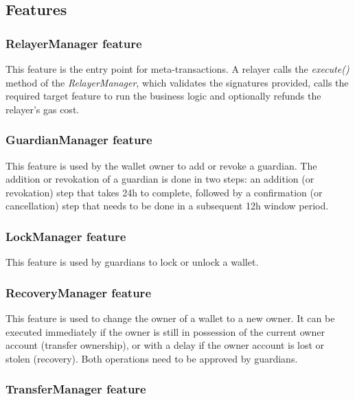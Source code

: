 \documentclass[12pt]{article}
\begin{document}
\subsection{Features}

\subsubsection{RelayerManager feature}\label{RelayerManager}

This feature is the entry point for meta-transactions. A relayer calls the \emph{execute()} method of the \emph{RelayerManager}, which validates the signatures provided, calls the required target feature to run the business logic and optionally refunds the relayer's gas cost.

\subsubsection{GuardianManager feature}

This feature is used by the wallet owner to add or revoke a guardian. The addition or revokation of a guardian is done in two steps: an addition (or revokation) step that takes 24h to complete, followed by a confirmation (or cancellation) step that needs to be done in a subsequent 12h window period.

\subsubsection{LockManager feature}

This feature is used by guardians to lock or unlock a wallet.

\subsubsection{RecoveryManager feature}

This feature is used to change the owner of a wallet to a new owner. It can be executed immediately if the owner is still in possession of the current owner account (transfer ownership), or with a delay if the owner account is lost or stolen (recovery). Both operations need to be approved by guardians.

\subsubsection{TransferManager feature}
\end{document}

